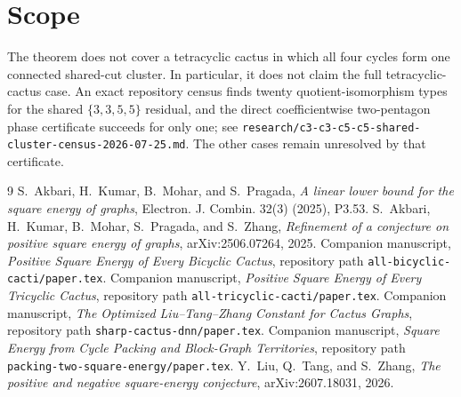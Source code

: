 \documentclass[11pt]{article}
\begin{document}
\section{Scope}

The theorem does not cover a tetracyclic cactus in which all four cycles form
one connected shared-cut cluster.  In particular, it does not claim the full
tetracyclic-cactus case.  An exact repository census finds twenty
quotient-isomorphism types for the shared $\{3,3,5,5\}$ residual, and the
direct coefficientwise two-pentagon phase certificate succeeds for only one;
see \texttt{research/c3-c3-c5-c5-shared-cluster-census-2026-07-25.md}.
The other cases remain unresolved by that certificate.

\begin{thebibliography}{9}
S.~Akbari, H.~Kumar, B.~Mohar, and S.~Pragada,
\emph{A linear lower bound for the square energy of graphs},
Electron. J. Combin. 32(3) (2025), P3.53.
S.~Akbari, H.~Kumar, B.~Mohar, S.~Pragada, and S.~Zhang,
\emph{Refinement of a conjecture on positive square energy of graphs},
arXiv:2506.07264, 2025.
Companion manuscript, \emph{Positive Square Energy of Every Bicyclic Cactus},
repository path \texttt{all-bicyclic-cacti/paper.tex}.
Companion manuscript, \emph{Positive Square Energy of Every Tricyclic Cactus},
repository path \texttt{all-tricyclic-cacti/paper.tex}.
Companion manuscript, \emph{The Optimized Liu--Tang--Zhang Constant for Cactus
Graphs}, repository path \texttt{sharp-cactus-dnn/paper.tex}.
Companion manuscript, \emph{Square Energy from Cycle Packing and Block-Graph
Territories}, repository path \texttt{packing-two-square-energy/paper.tex}.
Y.~Liu, Q.~Tang, and S.~Zhang,
\emph{The positive and negative square-energy conjecture},
arXiv:2607.18031, 2026.
\end{thebibliography}
\end{document}
